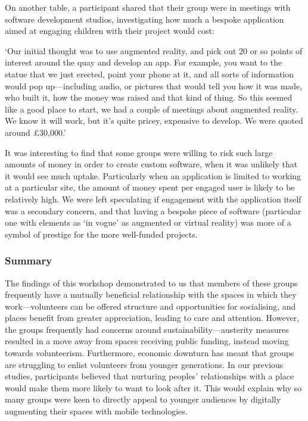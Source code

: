 On another table, a participant shared that their group were in meetings with software development studios, investigating how much a bespoke application aimed at engaging children with their project would cost:

\begin{displayquote}
`Our initial thought was to use augmented reality, and pick out 20 or so points of interest around the quay and develop an app. For example, you want to the statue that we just erected, point your phone at it, and all sorts of information would pop up---including audio, or pictures that would tell you how it was made, who built it, how the money was raised and that kind of thing. So this seemed like a good place to start, we had a couple of meetings about augmented reality. We know it will work, but it's quite pricey, expensive to develop. We were quoted around £30,000.'
\end{displayquote}

It was interesting to find that some groups were willing to risk such large amounts of money in order to create custom software, when it was unlikely that it would see much uptake. Particularly when an application is limited to working at a particular site, the amount of money spent per engaged user is likely to be relatively high. We were left speculating if engagement with the application itself was a secondary concern, and that having a bespoke piece of software (particular one with elements as `in vogue' as augmented or virtual reality) was more of a symbol of prestige for the more well-funded projects.

\subsubsection{Summary}
The findings of this workshop demonstrated to us that members of these groups frequently have a mutually beneficial relationship with the spaces in which they work---volunteers can be offered structure and opportunities for socialising, and places benefit from greater appreciation, leading to care and attention. However, the groups frequently had concerns around sustainability---austerity measures resulted in a move away from spaces receiving public funding, instead moving towards volunteerism. Furthermore, economic downturn has meant that groups are struggling to enlist volunteers from younger generations. In our previous studies, participants believed that nurturing peoples' relationships with a place would make them more likely to want to look after it. This would explain why so many groups were keen to directly appeal to younger audiences by digitally augmenting their spaces with mobile technologies. 

